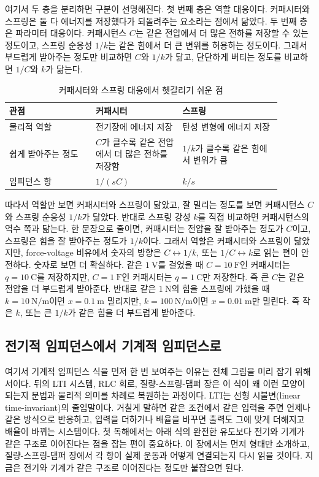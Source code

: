 여기서 두 층을 분리하면 구분이 선명해진다.
첫 번째 층은 역할 대응이다.
커패시터와 스프링은 둘 다 에너지를 저장했다가 되돌려주는 요소라는 점에서 닮았다.
두 번째 층은 파라미터 대응이다.
커패시턴스 $C$는 같은 전압에서 더 많은 전하를 저장할 수 있는 정도이고, 스프링 순응성 $1/k$는 같은 힘에서 더 큰 변위를 허용하는 정도이다.
그래서 부드럽게 받아주는 정도만 비교하면 $C$와 $1/k$가 닮고, 단단하게 버티는 정도를 비교하면 $1/C$와 $k$가 닮는다.

\begin{table}[!htbp]
  \centering
  \caption{커패시터와 스프링 대응에서 헷갈리기 쉬운 점}
  \begin{tabular}{p{0.28\linewidth}p{0.28\linewidth}p{0.32\linewidth}}
    \toprule
    관점 & 커패시터 & 스프링 \\
    \midrule
    물리적 역할 & 전기장에 에너지 저장 & 탄성 변형에 에너지 저장 \\
    쉽게 받아주는 정도 & $C$가 클수록 같은 전압에서 더 많은 전하를 저장함 & $1/k$가 클수록 같은 힘에서 변위가 큼 \\
    임피던스 항 & $1/(sC)$ & $k/s$ \\
    \bottomrule
  \end{tabular}
\end{table}

따라서 역할만 보면 커패시터와 스프링이 닮았고, 잘 밀리는 정도를 보면 커패시턴스 $C$와 스프링 순응성 $1/k$가 닮았다.
반대로 스프링 강성 $k$를 직접 비교하면 커패시턴스의 역수 쪽과 닮는다.
한 문장으로 줄이면, 커패시터는 전압을 잘 받아주는 정도가 $C$이고, 스프링은 힘을 잘 받아주는 정도가 $1/k$이다.
그래서 역할은 커패시터와 스프링이 닮았지만, force-voltage 비유에서 숫자의 방향은 $C \leftrightarrow 1/k$, 또는 $1/C \leftrightarrow k$로 읽는 편이 안전하다.
숫자로 보면 더 확실하다.
같은 $1~\mathrm{V}$를 걸었을 때 $C=10~\mathrm{F}$인 커패시터는 $q=10~\mathrm{C}$를 저장하지만, $C=1~\mathrm{F}$인 커패시터는 $q=1~\mathrm{C}$만 저장한다.
즉 큰 $C$는 같은 전압을 더 부드럽게 받아준다.
반대로 같은 $1~\mathrm{N}$의 힘을 스프링에 가했을 때 $k=10~\mathrm{N/m}$이면 $x=0.1~\mathrm{m}$ 밀리지만, $k=100~\mathrm{N/m}$이면 $x=0.01~\mathrm{m}$만 밀린다.
즉 작은 $k$, 또는 큰 $1/k$가 같은 힘을 더 부드럽게 받아준다.

\subsection{전기적 임피던스에서 기계적 임피던스로}

여기서 기계적 임피던스 식을 먼저 한 번 보여주는 이유는 전체 그림을 미리 잡기 위해서이다.
뒤의 LTI 시스템, RLC 회로, 질량-스프링-댐퍼 장은 이 식이 왜 이런 모양이 되는지 문법과 물리적 의미를 차례로 복원하는 과정이다.
LTI는 선형 시불변(linear time-invariant)의 줄임말이다.
거칠게 말하면 같은 조건에서 같은 입력을 주면 언제나 같은 방식으로 반응하고, 입력을 더하거나 배율을 바꾸면 출력도 그에 맞게 더해지고 배율이 바뀌는 시스템이다.
첫 독해에서는 아래 식의 완전한 유도보다 전기와 기계가 같은 구조로 이어진다는 점을 잡는 편이 중요하다.
이 장에서는 먼저 형태만 소개하고, 질량-스프링-댐퍼 장에서 각 항이 실제 운동과 어떻게 연결되는지 다시 읽을 것이다.
지금은 전기와 기계가 같은 구조로 이어진다는 정도만 붙잡으면 된다.

